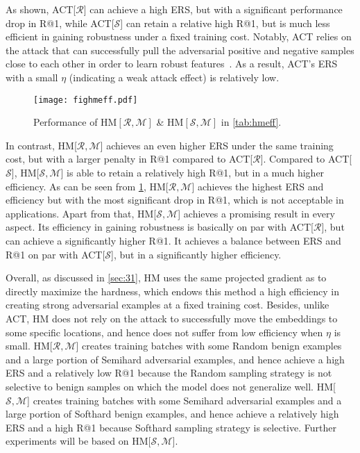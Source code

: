 \documentclass[10pt,twocolumn,letterpaper]{article}
\begin{document}

As shown, ACT[$\mathcal{R}$] can achieve a high ERS, but with a significant
performance drop in R@1, while ACT[$\mathcal{S}$] can retain a relative high
R@1, but is much less efficient in gaining robustness under a fixed training
cost.
%
Notably, ACT relies on the attack that can successfully pull the adversarial
positive and negative samples close to each other in order to learn robust
features~\cite{robrank}.
%
As a result, ACT's ERS with a small $\eta$ (indicating a weak attack effect) is
relatively low.

\begin{figure}[t]
	\texttt{[image: fighmeff.pdf]}
	\vspace{-1.5em}
	\caption{Performance of $\text{HM}[\mathcal{R},\mathcal{M}]$
	\& $\text{HM}[\mathcal{S},\mathcal{M}]$ in \cref{tab:hmeff}.
%
	}
	\label{fig:hmeff}
\end{figure}


In contrast, HM[$\mathcal{R},\mathcal{M}$] achieves an even higher ERS under
the same training cost, but with a larger penalty in R@1 compared to
ACT[$\mathcal{R}$].
%
Compared to ACT[$\mathcal{S}$], HM[$\mathcal{S},\mathcal{M}$] is able to retain
a relatively high R@1, but in a much higher efficiency.
%
As can be seen from \cref{fig:hmeff}, HM[$\mathcal{R},\mathcal{M}$] achieves the
highest ERS and efficiency but with the most significant drop in R@1, which is
not acceptable in applications.
%
Apart from that, HM[$\mathcal{S},\mathcal{M}$] achieves a promising result
in every aspect.
%
Its efficiency in gaining robustness is basically on par with
ACT[$\mathcal{R}$], but can achieve a significantly higher R@1.
%
It achieves a balance between ERS and R@1 on par with ACT[$\mathcal{S}$], but
in a significantly higher efficiency.





Overall, as discussed in \cref{sec:31}, HM uses the same projected gradient as
to directly maximize the hardness, which endows this method a high efficiency
in creating strong adversarial examples at a fixed training cost.
%
Besides, unlike ACT, HM does not rely on the attack to successfully move the
embeddings to some specific locations, and hence does not suffer from low
efficiency when $\eta$ is small.
%
HM[$\mathcal{R},\mathcal{M}$] creates training batches with some Random benign
examples and a large portion of Semihard adversarial examples, and hence
achieve a high ERS and a relatively low R@1 because the Random sampling
strategy is not selective to benign samples on which the model does not generalize well.
%
HM[$\mathcal{S},\mathcal{M}$] creates training batches with some Semihard
adversarial examples and a large portion of Softhard benign examples, and hence
achieve a relatively high ERS and a high R@1 because Softhard sampling
strategy is selective.
%
Further experiments will be based on HM[$\mathcal{S},\mathcal{M}$].
\end{document}

